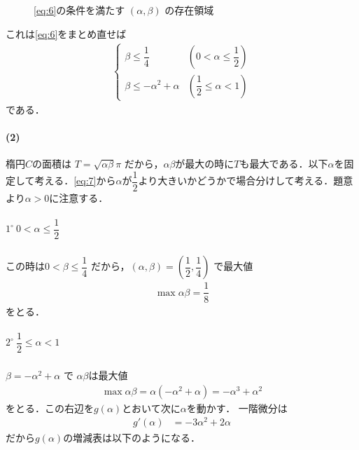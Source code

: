\documentclass[../../main.tex]{subfiles}
\begin{document}
\begin{figure}[htb]
  \caption{\cref{eq:6}の条件を満たす $(\alpha,\beta)$ の存在領域}
  \label{fig:alpha_beta_region_part1}
\end{figure}

これは\cref{eq:6}をまとめ直せば
\begin{align}
  \begin{cases}
    \beta \le \dfrac{1}{4} & \left(0 < \alpha \le \dfrac{1}{2}\right) \\
    \beta \le -\alpha^2+\alpha & \left(\dfrac{1}{2} \le \alpha < 1\right)
  \end{cases} \label{eq:7}
\end{align}
である．

\paragraph{(2)}

楕円$C$の面積は $T = \sqrt{\alpha\beta} \pi$ だから，$\alpha\beta$が最大の時に$T$も最大である．以下$\alpha$を固定して考える．\cref{eq:7}から$\alpha$が$\dfrac{1}{2}$より大きいかどうかで場合分けして考える．題意より$\alpha>0$に注意する．

\subparagraph{$1^\circ \ 0 < \alpha \le \dfrac{1}{2}$}

この時は$0 < \beta \le \dfrac{1}{4}$ だから，$(\alpha, \beta) = \left(\dfrac{1}{2}, \dfrac{1}{4}\right)$ で最大値
\begin{align}
  \max \alpha\beta = \dfrac{1}{8} \label{eq:8}
\end{align}
をとる．

\subparagraph{$2^\circ \ \dfrac{1}{2} \le \alpha < 1$}

$\beta = -\alpha^2 + \alpha$ で $\alpha\beta$は最大値
\begin{align}
  \max \alpha\beta = \alpha(-\alpha^2 + \alpha) = -\alpha^3+\alpha^2
\end{align}
をとる．この右辺を$g(\alpha)$とおいて次に$\alpha$を動かす．
一階微分は
\begin{align}
  g'(\alpha) &= -3\alpha^2 + 2\alpha
\end{align}
だから$g(\alpha)$の増減表は以下のようになる．
\end{document}
